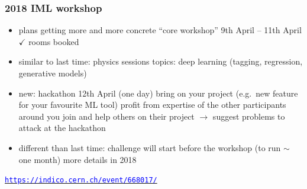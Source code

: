 \documentclass[table,xcolor=dvipsnames,professionalfonts]{beamer}
\newcommand{\openref}[1]{\href{#1}{\footnotesize{\textcolor{blue}{\texttt{#1}}}}}
\begin{document}
\begin{frame}
  \frametitle{2018 IML workshop}
  \begin{itemize}
      \item plans getting more and more concrete
        \newline ``core workshop'' 9th April -- 11th April
        \newline $\checkmark$ rooms booked
      \item similar to last time: physics sessions
        \newline topics: deep learning (tagging, regression, generative models)
      \item new: hackathon 12th April (one day)
        \newline bring on your project (e.g.\ new feature for your favourite ML tool)
        \newline profit from expertise of the other participants around you
        \newline join and help others on their project
        \newline $\rightarrow$ suggest problems to attack at the hackathon
      \item different than last time: challenge
        \newline will start before the workshop (to run $\sim$ one month)
        \newline more details in 2018
  \end{itemize}
  \openref{https://indico.cern.ch/event/668017/}
\end{frame}
\end{document}
